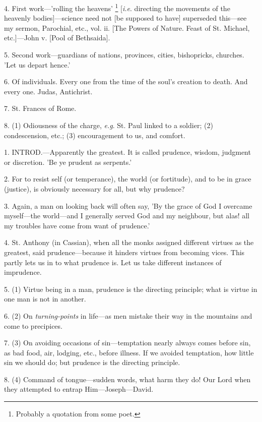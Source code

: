 4. First work—'rolling the heavens' \footnote{Probably a quotation
from some poet.} [\emph{i.e}. directing the movements of the heavenly
bodies]—science need not [be supposed to have] superseded this—see
my sermon, Parochial, etc., vol. ii. [The Powers of Nature. Feast of
St. Michael, etc.]—John v. [Pool of Bethsaida].

5. Second work—guardians of nations, provinces,
cities, bishopricks, churches. 'Let us depart hence.'

6. Of individuals. Every one from the time of the
soul's creation to death. And every one. Judas, Antichrist.

7. St. Frances of Rome.

8. (1) Odiousness of the charge, \emph{e.g}. St.
Paul linked to a soldier; (2) condescension, etc.; (3) encouragement
to us, and comfort.


1. INTROD.—Apparently
the greatest. It is called prudence, wisdom, judgment or discretion.
'Be ye prudent as serpents.'

2. For to resist self (or temperance), the world
(or fortitude), and to be in grace (justice), is obviously necessary
for all, but why prudence?

3. Again, a man on looking back will often say,
'By the grace of God I overcame myself—the world—and I generally
served God and my neighbour, but alas! all my troubles have come from
want of prudence.'

4. St. Anthony (in Cassian), when all the monks
assigned different virtues as the greatest, said prudence—because it
hinders virtues from becoming vices. This partly lets us in to what
prudence is. Let us take different instances of imprudence.

5. (1) Virtue being in a man, prudence is the
directing principle; what is virtue in one man is not in another.

6. (2) On \emph{turning-points} in life—as men
mistake their way in the mountains and come to precipices.

7. (3) On avoiding occasions of sin—temptation
nearly always comes before sin, as bad food, air, lodging, etc.,
before illness. If we avoided temptation, how little sin we
should do; but prudence is the directing principle.

8. (4) Command of tongue—sudden words, what
harm they do! Our Lord when they attempted to entrap
Him—Joseph—David.

